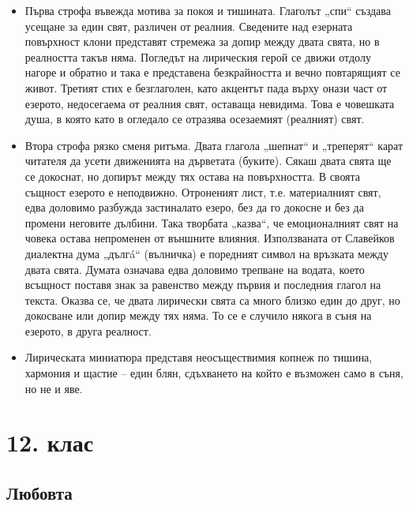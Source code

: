 \documentclass[12pt,a4paper]{article}
\begin{document}
\vspace{0.1cm}
\begin{itemize}[leftmargin=*, noitemsep, topsep=2pt, parsep=0pt]
    \item Първа строфа въвежда мотива за покоя и тишината. Глаголът „спи“ създава усещане за един свят, различен от реалния. Сведените над езерната повърхност клони представят стремежа за допир между двата свята, но в реалността такъв няма. Погледът на лирическия герой се движи отдолу нагоре и обратно и така е представена безкрайността и вечно повтарящият се живот. Третият стих е безглаголен, като акцентът пада върху онази част от езерото, недосегаема от реалния свят, оставаща невидима. Това е човешката душа, в която като в огледало се отразява осезаемият (реалният) свят.
    \vspace{0.1cm}
    \item Втора строфа рязко сменя ритъма. Двата глагола „шепнат“ и „треперят“ карат читателя да усети движенията на дърветата (буките). Сякаш двата свята ще се докоснат, но допирът между тях остава на повърхността. В своята същност езерото е неподвижно. Отроненият лист, т.е. материалният свят, едва доловимо разбужда застиналато езеро, без да го докосне и без да промени неговите дълбини. Така творбата „казва“, че емоционалният свят на човека остава непроменен от външните влияния. Използваната от Славейков диалектна дума „дългá“ (вълничка) е поредният символ на връзката между двата свята. Думата означава едва доловимо трепване на водата, което всъщност поставя знак за равенство между първия и последния глагол на текста. Оказва се, че двата лирически свята са много близко един до друг, но докосване или допир между тях няма. То се е случило някога в съня на езерото, в друга реалност.
    \vspace{0.1cm}
    \item Лирическата миниатюра представя неосъществимия копнеж по тишина, хармония и щастие – един блян, сдъхването на който е възможен само в съня, но не и яве.
\end{itemize}

\newpage

\section{12. клас}

\subsection{Любовта}
\end{document}
